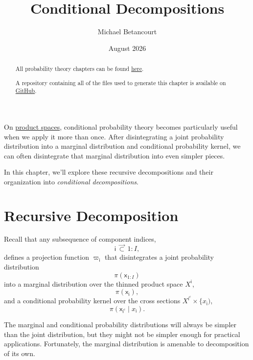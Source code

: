 \documentclass[
  letterpaper,
  DIV=11,
  numbers=noendperiod]{scrartcl}
\title{Conditional Decompositions}
\author{Michael Betancourt}
\date{August 2026}
\renewcommand*\contentsname{Table of contents}
\newcommand\contentsname{Table of contents}
\begin{document}
\maketitle
\begin{abstract}
All probability theory chapters can be found
\href{http://www.symplectomorphic.com/writing/\#part1}{here}.

A repository containing all of the files used to generate this chapter
is available on
\href{https://github.com/betanalpha/quarto_chapters/tree/main/10_probability_on_product_spaces}{GitHub}.
\end{abstract}

\renewcommand*\contentsname{Table of contents}
{
\hypersetup{linkcolor=}
\setcounter{tocdepth}{3}
\tableofcontents
}
\newcommand{\I}[2]{\mathbb{I}_{#1} \! \left[ #2 \right]}

\newcommand{\E}[2]{\mathbb{E}_{#1} \! \left[ #2 \right]}

\newcommand{\rnd}[2]{\frac{ \mathrm{d} #1}{ \mathrm{d} #2 }}

On
\href{http://www.symplectomorphic.com/assets/chapters_html/probability_theory_on_product_spaces}{product
spaces}, conditional probability theory becomes particularly useful when
we apply it more than once. After disintegrating a joint probability
distribution into a marginal distribution and conditional probability
kernel, we can often disintegrate that marginal distribution into even
simpler pieces.

In this chapter, we'll explore these recursive decompositions and their
organization into \emph{conditional decompositions}.

\section{Recursive Decomposition}\label{recursive-decomposition}

Recall that any subsequence of component indices, \[
\mathsf{i} \, \vec{\subset} \, 1:I,
\] defines a projection function \(\varpi_{ \mathsf{i} }\) that
disintegrates a joint probability distribution \[
\pi ( \mathsf{x}_{1:I} )
\] into a marginal distribution over the thinned product space
\(X^{\mathsf{i}}\), \[
\pi ( \mathsf{x}_{\mathsf{i}} ),
\] and a conditional probability kernel over the cross sections
\(X^{ \mathsf{i}^{c} } \times \{ x_{ \mathsf{i} }  )\), \[
\pi(
  \mathsf{x}_{\mathsf{i}^{c}} \mid
  x_{ \mathsf{i} }
).
\]

The marginal and conditional probability distributions will always be
simpler than the joint distribution, but they might not be simpler
enough for practical applications. Fortunately, the marginal
distribution is amenable to decomposition of its own.
\end{document}
